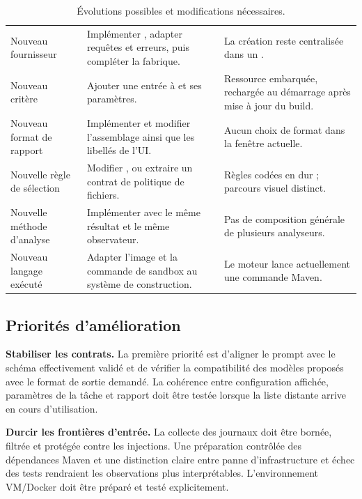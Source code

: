 \begin{table}[H]
\small
\begin{tabularx}{\textwidth}{@{}P{32mm}YP{43mm}@{}}
\toprule
{} &  & \\
\midrule
Nouveau fournisseur & Implémenter , adapter requêtes et erreurs, puis compléter la fabrique. & La création reste centralisée dans un .\\
Nouveau critère & Ajouter une entrée à  et ses paramètres. & Ressource embarquée, rechargée au démarrage après mise à jour du build.\\
Nouveau format de rapport & Implémenter  et modifier l'assemblage ainsi que les libellés de l'UI. & Aucun choix de format dans la fenêtre actuelle.\\
Nouvelle règle de sélection & Modifier , ou extraire un contrat de politique de fichiers. & Règles codées en dur ; parcours visuel distinct.\\
Nouvelle méthode d'analyse & Implémenter  avec le même résultat et le même observateur. & Pas de composition générale de plusieurs analyseurs.\\
Nouveau langage exécuté & Adapter l'image et la commande de sandbox au système de construction. & Le moteur lance actuellement une commande Maven.\\
\bottomrule
\end{tabularx}
\caption{Évolutions possibles et modifications nécessaires.}
\end{table}

\subsection{Priorités d'amélioration}
\textbf{Stabiliser les contrats.} La première priorité est d'aligner le prompt avec le schéma effectivement validé et de vérifier la compatibilité des modèles proposés avec le format de sortie demandé. La cohérence entre configuration affichée, paramètres de la tâche et rapport doit être testée lorsque la liste distante arrive en cours d'utilisation.

\textbf{Durcir les frontières d'entrée.} La collecte des journaux doit être bornée, filtrée et protégée contre les injections. Une préparation contrôlée des dépendances Maven et une distinction claire entre panne d'infrastructure et échec des tests rendraient les observations plus interprétables. L'environnement VM/Docker doit être préparé et testé explicitement.

